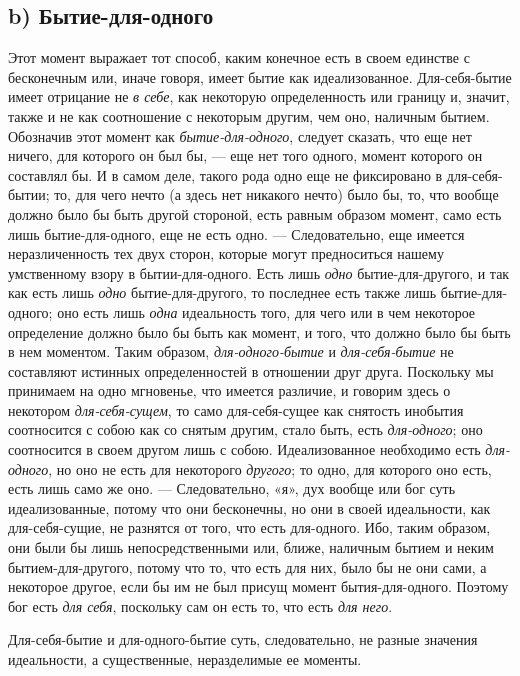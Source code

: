 \subsection*{b) Бытие-для-одного}
Этот момент выражает тот способ, каким конечное есть в своем единстве с
бесконечным или, иначе говоря, имеет бытие как идеализованное.
Для-себя-бытие имеет отрицание не {\em в себе}, как
некоторую определенность или границу и, значит, также и не как соотношение
с некоторым другим, чем оно, наличным бытием. Обозначив этот момент как
{\em бытие-для-одного}, следует сказать, что еще нет
ничего, для которого он был бы, — еще нет того одного, момент которого он
составлял бы. И в самом деле, такого рода одно еще не фиксировано в
для-себя-бытии; то, для чего нечто (а здесь нет никакого нечто) было бы,
то, что вообще должно было бы быть другой стороной, есть равным образом
момент, само есть лишь бытие-для-одного, еще не есть одно. — Следовательно,
еще имеется неразличенность тех двух сторон, которые могут предноситься
нашему умственному взору в бытии-для-одного. Есть лишь
{\em одно} бытие-для-другого, и так как есть лишь
{\em одно} бытие-для-другого, то последнее есть также
лишь бытие-для-одного; оно есть лишь {\em одна}
идеальность того, для чего или в чем некоторое определение должно было бы
быть как момент, и того, что должно было бы быть в нем моментом. Таким
образом, {\em для-одного-бытие} и
{\em для-себя-бытие} не составляют истинных
определенностей в отношении друг друга. Поскольку мы принимаем на одно
мгновенье, что имеется различие, и говорим здесь о некотором
{\em для-себя-сущем}, то само для-себя-сущее как
снятость инобытия соотносится с собою как со снятым другим, стало быть,
есть {\em для-одного}; оно соотносится в своем другом
лишь с собою. Идеализованное необходимо есть
{\em для-одного}, но оно не есть для некоторого
{\em другого}; то одно, для которого оно есть, есть
лишь само же оно. — Следовательно, «я», дух вообще или бог суть
идеализованные, потому что они бесконечны, но они в своей идеальности, как
для-себя-сущие, не разнятся от того, что есть для-одного. Ибо, таким
образом, они были бы лишь непосредственными или, ближе, наличным бытием и
неким бытием-для-другого, потому что то, что есть для них, было бы не они
сами, а некоторое другое, если бы им не был присущ момент бытия-для-одного.
Поэтому бог есть {\em для себя}, поскольку сам он есть
то, что есть {\em для него}.

Для-себя-бытие и для-одного-бытие суть, следовательно, не разные значения
идеальности, а существенные, неразделимые ее моменты.

